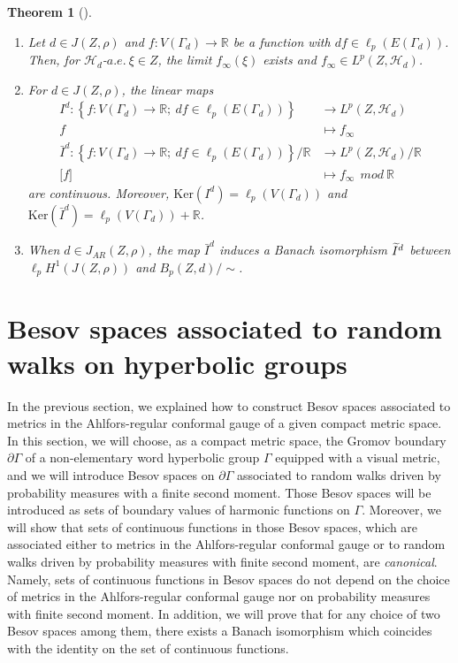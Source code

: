 \documentclass[10pt]{amsart}
\newtheorem{theo}{Theorem}[section]
\theoremstyle{definition}\newtheorem{defi}[theo]{Definition}\newtheorem{rema}[theo]{Remark}\newtheorem{exam}[theo]{Example}\newtheorem{exem}[theo]{Example}\newtheorem{nota}[theo]{Notation}
\newcommand{\ch}{\mathcal{H}}
\newcommand{\br}{\mathbb{R}}
\newcommand{\Ker}{\mathrm{Ker}}
\let\oldtilde\tilde
\renewcommand*{\tilde}[1]{\mathchoice{\widetilde{#1}}{\widetilde{#1}}{\oldtilde{#1}}{\oldtilde{#1}}}
\begin{document}
\begin{theo}[{\cite[Theorem~0.1, Theorem~3.1, Theorem~3.4.]{BP}}]\label{besov}\leavevmode
\begin{enumerate}
\item\label{theo4.6.1} Let $d\in J(Z,\rho)$ and $f:V(\Gamma_{d})\to\br$ be a function with $df\in\ell_p(E(\Gamma_{d}))$. Then, for $\ch_{d}$-$a.e.\ \xi\in Z$, the limit $f_{\infty}(\xi)$ exists and $f_{\infty}\in L^p(Z,\ch_{d})$.
\item\label{theo4.6.2} For $d\in J(Z,\rho)$, the linear maps
\begin{align*}
I^{d}: \left\{f:V(\Gamma_{d})\rightarrow\br;\ df\in\ell_p(E(\Gamma_{d})) \right\}&\rightarrow L^p(Z,\ch_{d})\\
f &\mapsto f_{\infty}\\
\bar{I}^{d}:\left\{f:V(\Gamma_{d})\rightarrow\br;\ df\in\ell_p(E(\Gamma_{d}))\right\}/\br&\rightarrow L^p(Z,\ch_{d})/\br\\
\lbrack f \rbrack&\mapsto f_{\infty}\ \ mod\ \br
\end{align*}
are continuous. Moreover, $\Ker(I^d)=\ell_p(V(\Gamma_{d}))$ and $\Ker(\bar{I}^d)=\ell_p(V(\Gamma_{d}))+\br$.

\item When $d\in J_{AR}(Z,\rho)$, the map $\bar{I}^{d}$ induces a Banach isomorphism $\tilde{I}^{d}$ between $\ell_pH^1(J(Z,\rho))$ and $B_p(Z,d)/\sim$.
\end{enumerate}
\end{theo}

\section{Besov spaces associated to random walks on hyperbolic groups}\label{besov-hg}
In the previous section, we explained how to construct Besov spaces associated to metrics in the Ahlfors-regular conformal gauge of a given compact metric space. In this section, we will choose, as a compact metric space, the Gromov boundary $\partial\Gamma$ of a non-elementary word hyperbolic group $\Gamma$ equipped with a visual metric, and we will introduce Besov spaces on $\partial\Gamma$ associated to random walks driven by probability measures with a finite second moment. Those Besov spaces will be introduced as sets of boundary values of harmonic functions on $\Gamma$. Moreover, we will show that sets of continuous functions in those Besov spaces, which are associated either to metrics in the Ahlfors-regular conformal gauge or to random walks driven by probability measures with finite second moment, are \emph{canonical}. Namely, sets of continuous functions in Besov spaces do not depend on the choice of metrics in the Ahlfors-regular conformal gauge nor on probability measures with finite second moment. In addition, we will prove that for any choice of two Besov spaces among them, there exists a Banach isomorphism which coincides with the identity on the set of continuous functions.
\end{document}
